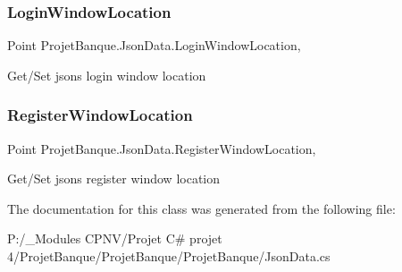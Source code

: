 \subsubsection{\texorpdfstring{LoginWindowLocation}{LoginWindowLocation}}
{\footnotesize\ttfamily Point Projet\+Banque.\+Json\+Data.\+Login\+Window\+Location\hspace{0.3cm}{\ttfamily [get]}, {\ttfamily [set]}}



Get/\+Set json\textquotesingle{}s login window location 

\mbox{\label{class_projet_banque_1_1_json_data_ae2055a1365e1c285dfcbf4b5c4b28375}} 
\subsubsection{\texorpdfstring{RegisterWindowLocation}{RegisterWindowLocation}}
{\footnotesize\ttfamily Point Projet\+Banque.\+Json\+Data.\+Register\+Window\+Location\hspace{0.3cm}{\ttfamily [get]}, {\ttfamily [set]}}



Get/\+Set json\textquotesingle{}s register window location 



The documentation for this class was generated from the following file\+:\begin{DoxyCompactItemize}
\item 
P\+:/\+\_\+\+Modules C\+P\+N\+V/\+Projet C\# projet 4/\+Projet\+Banque/\+Projet\+Banque/\+Projet\+Banque/Json\+Data.\+cs\end{DoxyCompactItemize}
